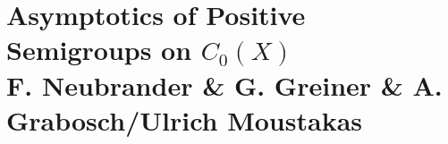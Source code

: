 
\chapter{Asymptotics of Positive Semigroups on $C_{0}(X)$ \\
F. Neubrander \& G. Greiner \& A. Grabosch/Ulrich Moustakas}\label{chap:B-IV}
